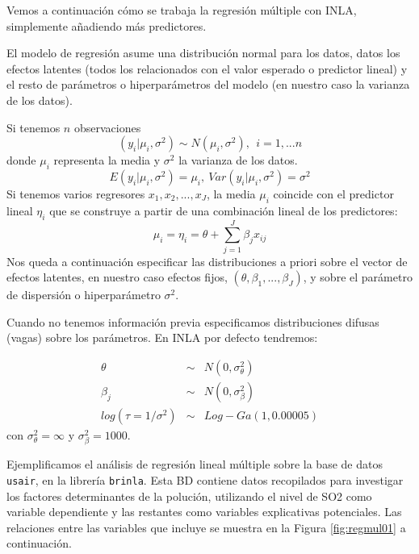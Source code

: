 \documentclass[
]{book}
\begin{document}
Vemos a continuación cómo se trabaja la regresión múltiple con INLA, simplemente añadiendo más predictores.

El modelo de regresión asume una distribución normal para los datos, datos los efectos latentes (todos los relacionados con el valor esperado o predictor lineal) y el resto de parámetros o hiperparámetros del modelo (en nuestro caso la varianza de los datos).

Si tenemos \(n\) observaciones
\[ (y_i|\mu_i,\sigma^2) \sim N(\mu_i,\sigma^2), \ \ i=1,...n\]
donde \(\mu_i\) representa la media y \(\sigma^2\) la varianza de los datos.
\[E(y_i|\mu_i,\sigma^2)=\mu_i, \ Var(y_i|\mu_i,\sigma^2)=\sigma^2\]
Si tenemos varios regresores \(x_1,x_2,...,x_J\), la media \(\mu_i\) coincide con el predictor lineal \(\eta_i\) que se construye a partir de una combinación lineal de los predictores:
\[\mu_i=\eta_i=\theta+ \sum_{j=1}^J \beta_j x_{ij}\]
Nos queda a continuación especificar las distribuciones a priori sobre el vector de efectos latentes, en nuestro caso efectos fijos, \((\theta,\beta_1,...,\beta_J)\), y sobre el parámetro de dispersión o hiperparámetro \(\sigma^2\).

Cuando no tenemos información previa especificamos distribuciones difusas (vagas) sobre los parámetros. En INLA por defecto tendremos:

\begin{eqnarray*}
\theta &\sim& N(0,\sigma_{\theta}^2)  \\
\beta_j &\sim& N(0,\sigma_{\beta}^2) \\
log(\tau=1/\sigma^2) &\sim& Log-Ga(1,0.00005)
\end{eqnarray*}
con \(\sigma_{\theta}^2=\infty\) y \(\sigma_{\beta}^2=1000\).

Ejemplificamos el análisis de regresión lineal múltiple sobre la base de datos \texttt{usair}, en la librería \texttt{brinla}. Esta BD contiene datos recopilados para investigar los factores determinantes de la polución, utilizando el nivel de SO2 como variable dependiente y las restantes como variables explicativas potenciales. Las relaciones entre las variables que incluye se muestra en la Figura \ref{fig:regmul01} a continuación.
\end{document}
